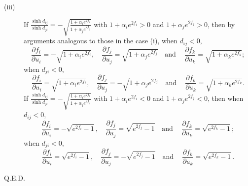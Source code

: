 \documentclass[12pt]{amsart}
\theoremstyle{definition}
\def\qed{\hfill{Q.E.D.}\smallskip}
\begin{document}
\begin{description}
\item[(iii)]
If $\frac{\sinh d_{ij}}{\sinh d_{ji}}
=-\sqrt{\frac{1+\alpha_{i}e^{2f_i}}{1+\alpha_{j}e^{2f_j}}}$
with $1+\alpha_{i}e^{2f_i}>0$ and $1+\alpha_{j}e^{2f_j}>0$,
then by arguments analogous to those in the case (i),
when $d_{ij}<0$,
\begin{equation*}
\frac{\partial f_i}{\partial u_i}=-\sqrt{1+\alpha_ie^{2f_i}}, \quad
\frac{\partial f_j}{\partial u_j}=\sqrt{1+\alpha_je^{2f_j}} \quad \text{and}\ \quad
\frac{\partial f_k}{\partial u_k}=\sqrt{1+\alpha_ke^{2f_k}};
\end{equation*}
when $d_{ji}<0$,
\begin{equation*}
\frac{\partial f_i}{\partial u_i}=\sqrt{1+\alpha_ie^{2f_i}}, \quad
\frac{\partial f_j}{\partial u_j}=-\sqrt{1+\alpha_je^{2f_j}} \quad \text{and}\  \quad
\frac{\partial f_k}{\partial u_k}=\sqrt{1+\alpha_ke^{2f_k}}.
\end{equation*}
If $\frac{\sinh d_{ij}}{\sinh d_{ji}}
=-\sqrt{\frac{1+\alpha_{i}e^{2f_i}}{1+\alpha_{j}e^{2f_j}}}$
with $1+\alpha_{i}e^{2f_i}<0$ and $1+\alpha_{j}e^{2f_j}<0$,
then
when $d_{ij}<0$,
\begin{equation}\label{Eq: F50}
\frac{\partial f_i}{\partial u_i}=-\sqrt{e^{2f_i}-1}, \quad
\frac{\partial f_j}{\partial u_j}=\sqrt{e^{2f_j}-1} \quad \text{and}\ \quad
\frac{\partial f_k}{\partial u_k}=\sqrt{e^{2f_k}-1};
\end{equation}
when $d_{ji}<0$,
\begin{equation*}
\frac{\partial f_i}{\partial u_i}=\sqrt{e^{2f_i}-1}, \quad
\frac{\partial f_j}{\partial u_j}=-\sqrt{e^{2f_j}-1} \quad \text{and}\  \quad
\frac{\partial f_k}{\partial u_k}=\sqrt{e^{2f_k}-1}.
\end{equation*}
\end{description}
\qed
\end{document}
